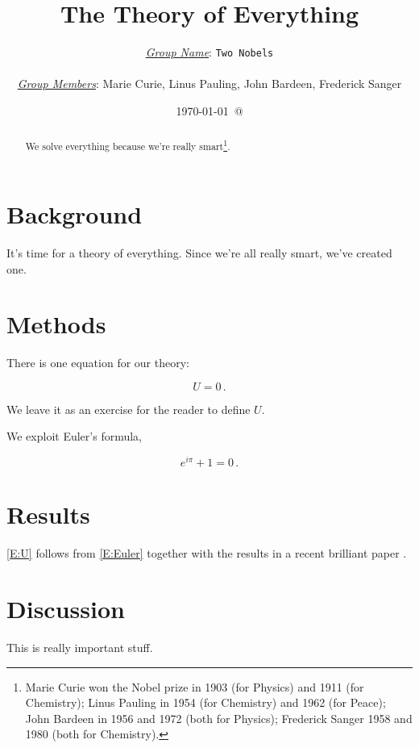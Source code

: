 \documentclass[12pt]{article}
\title{The Theory of Everything}
\author{\underline{\emph{Group Name}}: \texttt{{\color{blue}Two Nobels}}\\
{}\\
\underline{\emph{Group Members}}: {\color{blue}Marie Curie, Linus Pauling, John Bardeen, Frederick Sanger}}
\date{\today\ @ \thistime}
\begin{document}
\linenumbers

\maketitle

\begin{abstract}
We solve everything because we're really smart\footnote{Marie Curie won the Nobel prize in 1903 (for Physics) and 1911 (for Chemistry); Linus Pauling in 1954 (for Chemistry) and 1962 (for Peace); John Bardeen in 1956 and 1972 (both for Physics); Frederick Sanger 1958 and 1980 (both for Chemistry).}.
\end{abstract}

\tableofcontents

\section{Background}

It's time for a theory of everything.  Since we're all really smart, we've created one.

\section{Methods}

There is one equation for our theory:
%
\begin{linenomath*}
\begin{equation}\label{E:U}
U = 0 \,.
\end{equation}
\end{linenomath*}
%
We leave it as an exercise for the reader to define $U$.

We exploit Euler's formula,
%
\begin{linenomath*}
\begin{equation}\label{E:Euler}
e^{i\pi} + 1 = 0 \,.
\end{equation}
\end{linenomath*}
%


\section{Results}

\autoref{E:U} follows from \autoref{E:Euler} together with the results in a recent brilliant paper \cite{Dush96b}.

\section{Discussion}

This is really important stuff.



\end{document}
